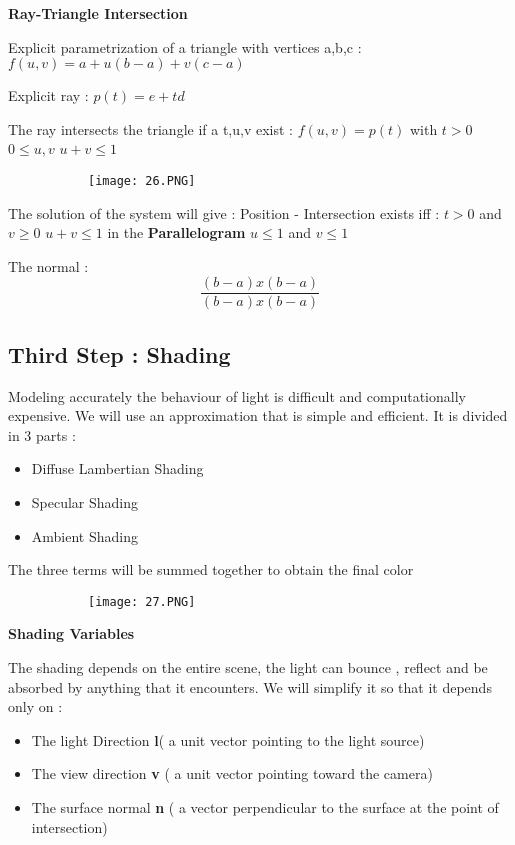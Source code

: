 \documentclass{article}
\begin{document}
\vspace{3mm}
\textbf{Ray-Triangle Intersection}

Explicit parametrization of a triangle with vertices a,b,c : 
$f(u,v) = a + u(b-a) + v(c-a)$

\vspace{2mm}
Explicit ray : $p(t) = e + td$

\vspace{2mm}
The ray intersects the triangle if a t,u,v exist : $f(u,v) = p(t)$ with $t > 0$ $0\leq u,v$  $u + v \leq 1$

\begin{figure}[ht!]
  \centering
  \begin{subfigure}[b]{0.7\linewidth}
    \texttt{[image: 26.PNG]}
  \end{subfigure}
\end{figure}

The solution of the system will give : Position - Intersection exists iff : $t>0$ and $v \geq 0 $ $u+v \leq 1$ in the \textbf{Parallelogram} $u \leq 1 $ and $v \leq 1$

The normal : \[\frac{(b-a) x (b-a)}{(b-a) x (b-a)}\]

\subsection{Third Step : Shading}

Modeling accurately the behaviour of light is difficult and computationally expensive. We will use an approximation that is simple and efficient. It is divided in 3 parts : 
\begin{itemize}
    \item Diffuse Lambertian Shading
    \item Specular Shading
    \item Ambient Shading
\end{itemize}
The three terms will be summed together to obtain the final color


\begin{figure}[ht!]
  \centering
  \begin{subfigure}[b]{0.3\linewidth}
    \texttt{[image: 27.PNG]}
  \end{subfigure}
\end{figure}

\vspace{3mm}
\textbf{Shading Variables}

The shading depends on the entire scene, the light can bounce , reflect and be absorbed by anything that it encounters. We will simplify it so that it depends only on : 
\begin{itemize}
    \item The light Direction \textbf{l}( a unit vector pointing to the light source)
    \item The view direction \textbf{v} ( a unit vector pointing toward the camera)
    \item The surface normal \textbf{n} ( a vector perpendicular to the surface at the point of intersection)
\end{itemize}
\end{document}
